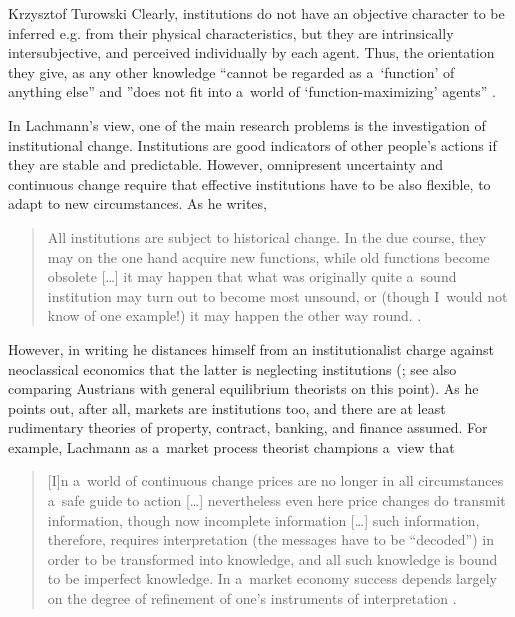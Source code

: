 \begin{artengenv}{Krzysztof Turowski}
Clearly, institutions do not have an objective character to be inferred e.g. from their physical characteristics, but they are intrinsically intersubjective, and perceived individually by each agent. Thus, the orientation they give, as any other knowledge ``cannot be regarded as a~`function' of anything else'' and ''does not fit into a~world of `function-maximizing' agents'' \parencite[277]{lachmann-hermeneutic}.

In Lachmann's view, one of the main research problems is the investigation of institutional change. Institutions are good indicators of other people's actions if they are stable and predictable.
However, omnipresent uncertainty and continuous change require that effective institutions have to be also flexible, to adapt to new circumstances. As he writes,
\begin{quote}
All institutions are subject to historical change. In the due course, they may on the one hand acquire new functions, while old functions become obsolete [\ldots] it may happen that what was originally quite a~sound institution may turn out to become most unsound, or (though I~would not know of one example!) it may happen the other way round. \parencite[177]{lachmann1962cost}.
\end{quote}

However, in writing he distances himself from an institutionalist charge against neoclassical economics that the latter is neglecting institutions (\cite[275]{lachmann-hermeneutic}; see also \cite[499]{udehn} comparing Austrians with general equilibrium theorists on this point).
As he points out, after all, markets are institutions too, and there are at least rudimentary theories of property, contract, banking, and finance assumed.
For example, Lachmann as a~market process theorist champions a~view that
\begin{quote}
[I]n a~world of continuous change prices are no longer in all circumstances a~safe guide to action [\ldots] nevertheless even here price changes do transmit information, though now incomplete information [\ldots] such information, therefore, requires interpretation (the messages have to be ``decoded'') in order to be transformed into knowledge, and all such knowledge is bound to be imperfect knowledge. In a~market economy success depends largely on the degree of refinement of one's instruments of interpretation \parencite[22]{lachmann1956capital}.
\end{quote}


\end{artengenv}
